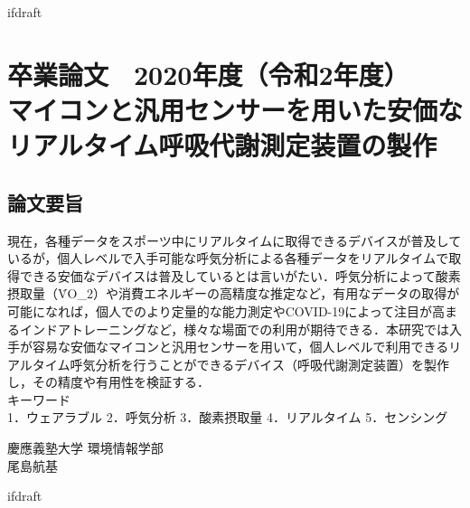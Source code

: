 \expandafter\ifx\csname ifdraft\endcsname\relax
 
\fi

\section*{卒業論文　2020年度（令和2年度）\\
\vspace{1em}
マイコンと汎用センサーを用いた安価な\\リアルタイム呼吸代謝測定装置の製作
}
\subsection*{論文要旨}
\noindent %

現在，各種データをスポーツ中にリアルタイムに取得できるデバイスが普及しているが，個人レベルで入手可能な呼気分析による各種データをリアルタイムで取得できる安価なデバイスは普及しているとは言いがたい．呼気分析によって酸素摂取量（\.{V}O_2）や消費エネルギーの高精度な推定など，有用なデータの取得が可能になれば，個人でのより定量的な能力測定やCOVID-19によって注目が高まるインドアトレーニングなど，様々な場面での利用が期待できる．本研究では入手が容易な安価なマイコンと汎用センサーを用いて，個人レベルで利用できるリアルタイム呼気分析を行うことができるデバイス（呼吸代謝測定装置）を製作し，その精度や有用性を検証する．\\

\noindent
キーワード\\
1．ウェアラブル 2．呼気分析 3．酸素摂取量 4．リアルタイム 5．センシング\\

\begin{flushright} %
  慶應義塾大学 環境情報学部\\
  尾島航基
\end{flushright}

\expandafter\ifx\csname ifdraft\endcsname\relax
  
\fi
